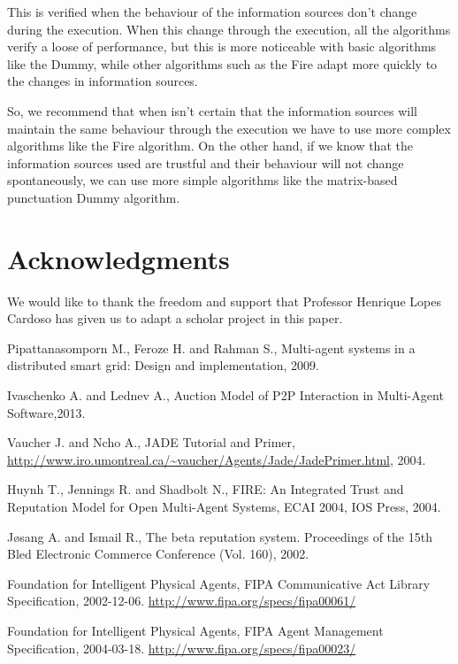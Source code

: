 \documentclass{llncs}
\begin{document}
This is verified when the behaviour of the information sources don't change during the execution. When this change through the execution, all the algorithms verify a loose of performance, but this is more noticeable with basic algorithms like the Dummy, while other algorithms such as the Fire adapt more quickly to the changes in information sources. 


So, we recommend that when isn't certain that the information sources will maintain the same behaviour through the execution we have to use more complex algorithms like the Fire algorithm. On the other hand, if we know that the information sources used are trustful and their behaviour will not change spontaneously, we can use more simple algorithms like the matrix-based punctuation Dummy algorithm.


\section*{Acknowledgments}\label{sec:Acknowledgments}

We would like to thank the freedom and support that Professor Henrique Lopes Cardoso has given us to adapt a scholar project in this paper.

\begin{thebibliography}{1}

Pipattanasomporn M., Feroze H. and Rahman S., Multi-agent systems in a distributed smart grid: Design and implementation, 2009.

Ivaschenko A. and Lednev A., Auction Model of P2P Interaction in Multi-Agent Software,2013.
 
Vaucher J. and Ncho A., JADE Tutorial and Primer, \url{http://www.iro.umontreal.ca/~vaucher/Agents/Jade/JadePrimer.html}, 2004.

Huynh T., Jennings R. and Shadbolt N., FIRE: An Integrated Trust and Reputation Model for Open Multi-Agent Systems, ECAI 2004, IOS Press, 2004.

Jøsang A. and Ismail R., The beta reputation system. Proceedings of the 15th Bled Electronic Commerce Conference (Vol. 160), 2002.

Foundation for Intelligent Physical Agents, FIPA Communicative Act Library Specification, 2002-12-06. \url{http://www.fipa.org/specs/fipa00061/}

Foundation for Intelligent Physical Agents, FIPA Agent Management Specification,  	
2004-03-18. \url{http://www.fipa.org/specs/fipa00023/}

\end{thebibliography}
\end{document}
